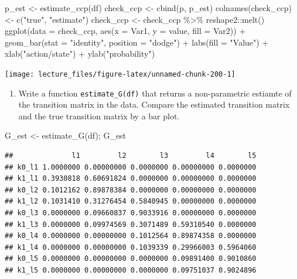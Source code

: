 \documentclass[
]{book}
\newenvironment{Shaded}{\begin{snugshade}}{\end{snugshade}}
\newcommand{\AttributeTok}[1]{\textcolor[rgb]{0.77,0.63,0.00}{#1}}
\newcommand{\FunctionTok}[1]{\textcolor[rgb]{0.00,0.00,0.00}{#1}}
\newcommand{\NormalTok}[1]{#1}
\newcommand{\OtherTok}[1]{\textcolor[rgb]{0.56,0.35,0.01}{#1}}
\newcommand{\SpecialCharTok}[1]{\textcolor[rgb]{0.00,0.00,0.00}{#1}}
\newcommand{\StringTok}[1]{\textcolor[rgb]{0.31,0.60,0.02}{#1}}
\providecommand{\tightlist}{%
  \setlength{\itemsep}{0pt}\setlength{\parskip}{0pt}}
\begin{document}
\begin{Shaded}
\begin{Highlighting}[]
\NormalTok{p\_est }\OtherTok{\textless{}{-}} \FunctionTok{estimate\_ccp}\NormalTok{(df)}
\NormalTok{check\_ccp }\OtherTok{\textless{}{-}} \FunctionTok{cbind}\NormalTok{(p, p\_est)}
\FunctionTok{colnames}\NormalTok{(check\_ccp) }\OtherTok{\textless{}{-}} \FunctionTok{c}\NormalTok{(}\StringTok{"true"}\NormalTok{, }\StringTok{"estimate"}\NormalTok{)}
\NormalTok{check\_ccp }\OtherTok{\textless{}{-}}\NormalTok{ check\_ccp }\SpecialCharTok{\%\textgreater{}\%}
\NormalTok{  reshape2}\SpecialCharTok{::}\FunctionTok{melt}\NormalTok{()}
\FunctionTok{ggplot}\NormalTok{(}\AttributeTok{data =}\NormalTok{ check\_ccp, }\FunctionTok{aes}\NormalTok{(}\AttributeTok{x =}\NormalTok{ Var1, }\AttributeTok{y =}\NormalTok{ value, }
                             \AttributeTok{fill =}\NormalTok{ Var2)) }\SpecialCharTok{+}
  \FunctionTok{geom\_bar}\NormalTok{(}\AttributeTok{stat =} \StringTok{"identity"}\NormalTok{, }\AttributeTok{position =} \StringTok{"dodge"}\NormalTok{) }\SpecialCharTok{+}
  \FunctionTok{labs}\NormalTok{(}\AttributeTok{fill =} \StringTok{"Value"}\NormalTok{) }\SpecialCharTok{+} \FunctionTok{xlab}\NormalTok{(}\StringTok{"action/state"}\NormalTok{) }\SpecialCharTok{+} \FunctionTok{ylab}\NormalTok{(}\StringTok{"probability"}\NormalTok{)}
\end{Highlighting}
\end{Shaded}

\begin{center}\texttt{[image: lecture\_files/figure-latex/unnamed-chunk-200-1]} \end{center}

\begin{enumerate}
\def\labelenumi{\arabic{enumi}.}
\setcounter{enumi}{8}
\tightlist
\item
  Write a function \texttt{estimate\_G(df)} that returns a non-parametric estiamte of the transition matrix in the data. Compare the estimated transition matrix and the true transition matrix by a bar plot.
\end{enumerate}

\begin{Shaded}
\begin{Highlighting}[]
\NormalTok{G\_est }\OtherTok{\textless{}{-}} \FunctionTok{estimate\_G}\NormalTok{(df); G\_est}
\end{Highlighting}
\end{Shaded}

\begin{verbatim}
##              l1         l2        l3         l4        l5
## k0_l1 1.0000000 0.00000000 0.0000000 0.00000000 0.0000000
## k1_l1 0.3930818 0.60691824 0.0000000 0.00000000 0.0000000
## k0_l2 0.1012162 0.89878384 0.0000000 0.00000000 0.0000000
## k1_l2 0.1031410 0.31276454 0.5840945 0.00000000 0.0000000
## k0_l3 0.0000000 0.09660837 0.9033916 0.00000000 0.0000000
## k1_l3 0.0000000 0.09974569 0.3071489 0.59310540 0.0000000
## k0_l4 0.0000000 0.00000000 0.1012564 0.89874358 0.0000000
## k1_l4 0.0000000 0.00000000 0.1039339 0.29966003 0.5964060
## k0_l5 0.0000000 0.00000000 0.0000000 0.09891400 0.9010860
## k1_l5 0.0000000 0.00000000 0.0000000 0.09751037 0.9024896
\end{verbatim}
\end{document}
